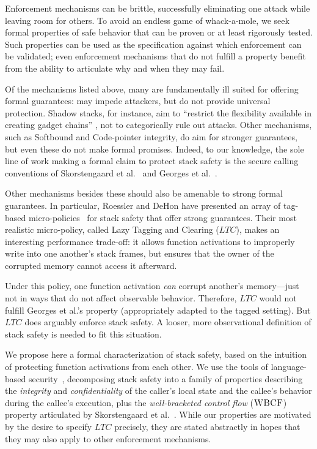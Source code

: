 \documentclass[10pt,conference]{ieeetran}%
\theoremstyle{definition}
\begin{document}
Enforcement mechanisms can be brittle, successfully eliminating one
attack while leaving room for others. To avoid an endless game of
whack-a-mole, we seek formal properties of safe behavior that can be
proven or at least rigorously tested. Such properties can be used as
the specification against which enforcement can be validated; even
enforcement mechanisms that do not fulfill a property benefit from the
ability to articulate why and when they may fail.

Of the mechanisms listed above, many are fundamentally ill suited for
offering formal guarantees: may impede attackers, but do not provide
universal protection. Shadow stacks, for instance, aim to ``restrict
the flexibility available in creating gadget chains''
\cite{Shanbhogue+19}, not to categorically rule out attacks. Other
mechanisms, such as Softbound\cite{NagarakatteZMZ09} and Code-pointer
integrity\cite{Kuznetsov+14}, do aim for stronger guarantees, but even
these do not make formal promises.  Indeed, to our knowledge, the sole
line of work making a formal claim to protect stack safety is the
secure calling conventions of Skorstengaard et
al.~\cite{SkorstengaardSTKJFP} and Georges et
al.~\cite{Georges22:TempsDesCerises}.

Other mechanisms besides these should also be amenable to strong
formal guarantees.  In particular, Roessler and DeHon
\cite{DBLP:conf/sp/RoesslerD18} have presented an array of tag-based
micro-policies~\cite{pump_oakland2015} for stack safety that offer
strong guarantees.  Their most realistic micro-policy, called Lazy
Tagging and Clearing (\(LTC\)), makes an interesting performance
trade-off: it allows function activations to improperly write into one
another's stack frames, but ensures that the owner of the corrupted
memory cannot access it afterward.

Under this policy, one function activation {\em can} corrupt another's
memory---just not in ways that do not affect observable behavior.
Therefore, \(LTC\) would not fulfill Georges et al.'s property
(appropriately adapted to the tagged setting).  But \(LTC\) does
arguably enforce stack safety.  A looser, more observational
definition of stack safety is needed to fit this situation.

We propose here a formal characterization of stack safety, based on
the intuition of protecting function activations from each other.
We use the tools of language-based
security~\cite{sabelfeld2003language}, decomposing stack safety into a family of
properties describing
the {\em integrity} and {\em confidentiality} of the caller’s local state
and the callee's behavior during the callee's execution, plus the
{\em well-bracketed control flow} (\(\textnormal{\sc WBCF}\)) property articulated by
Skorstengaard et al.~\cite{SkorstengaardSTKJFP}.
While our properties are motivated by the desire to specify \(LTC\) precisely, 
they are stated abstractly in hopes that they may also apply
to other enforcement mechanisms.
\end{document}
